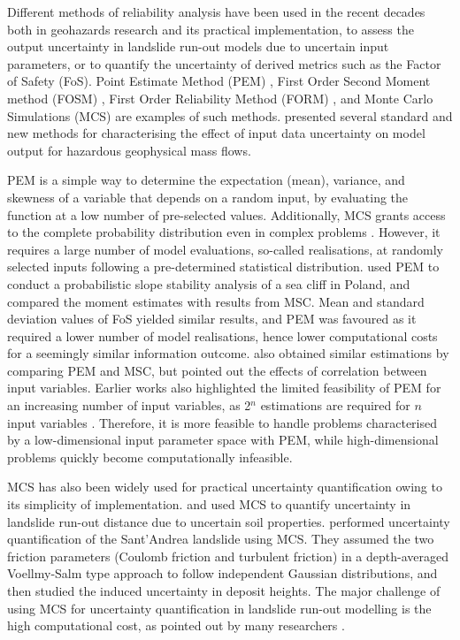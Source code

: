 \documentclass[utf8]{FrontiersinHarvard}
\begin{document}
Different methods of reliability analysis have been used in the recent decades both in geohazards research and its practical implementation, to assess the output uncertainty in landslide run-out models due to uncertain input parameters, or to quantify the uncertainty of derived metrics such as the Factor of Safety (FoS). Point Estimate Method (PEM) \citep{Przewlocki2019}, First Order Second Moment method (FOSM) \citep{Kaynia2008}, First Order Reliability Method (FORM) \citep{Sun2021}, and Monte Carlo Simulations (MCS) \citep{Cepeda2013,Liu2019,Brezzi2021} are examples of such methods. \citet{Dalbey2008} presented several standard and new methods for characterising the effect of input data uncertainty on model output for hazardous geophysical mass flows.

PEM is a simple way to determine the expectation (mean), variance, and skewness of a variable that depends on a random input, by evaluating the function at a low number of pre-selected values. Additionally, MCS grants access to the complete probability distribution even in complex problems \citep{Fenton2008}. However, it requires a large number of model evaluations, so-called realisations, at randomly selected inputs following a pre-determined statistical distribution. \citet{Przewlocki2019} used PEM to conduct a probabilistic slope stability analysis of a sea cliff in Poland, and compared the moment estimates with results from MSC. Mean and standard deviation values of FoS yielded similar results, and PEM was favoured as it required a lower number of model realisations, hence lower computational costs for a seemingly similar information outcome. \citet{Tsai2015} also obtained similar estimations by comparing PEM and MSC, but pointed out the effects of correlation between input variables. Earlier works also highlighted the limited feasibility of PEM for an increasing number of input variables, as 2$^n$ estimations are required for $n$ input variables \citep{Christian1999,Christian2002}. Therefore, it is more feasible to handle problems characterised by a low-dimensional input parameter space with PEM, while high-dimensional problems quickly become computationally infeasible.

MCS has also been widely used for practical uncertainty quantification owing to its simplicity of implementation. \citet{Liu2019} and \citet{Ma2022} used MCS to quantify uncertainty in landslide run-out distance due to uncertain soil properties. \citet{Brezzi2021} performed uncertainty quantification of the Sant'Andrea landslide using MCS. They assumed the two friction parameters (Coulomb friction and turbulent friction) in a depth-averaged Voellmy-Salm type approach to follow independent Gaussian distributions, and then studied the induced uncertainty in deposit heights. The major challenge of using MCS for uncertainty quantification in landslide run-out modelling is the high computational cost, as pointed out by many researchers \citep{Dalbey2008, McDougall2017,Aaron2022,Zhao2022}.
\end{document}
